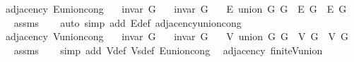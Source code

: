 \begin{isabellebody}
\isamarkupfalse%
\ {\isacharparenleft}{\kern0pt}\ adjacency{\isacharparenright}{\kern0pt}\ E{\isacharunderscore}{\kern0pt}union{\isacharunderscore}{\kern0pt}cong{\isacharcolon}{\kern0pt}\isanewline
\ \ \ {\isachardoublequoteopen}invar\ G{}{\isachardoublequoteclose}\isanewline
\ \ \ {\isachardoublequoteopen}invar\ G{}{\isachardoublequoteclose}\isanewline
\ \ \ {\isachardoublequoteopen}E\ {\isacharparenleft}{\kern0pt}union\ G{}\ G{}{\isacharparenright}{\kern0pt}\ {\isacharequal}{\kern0pt}\ E\ G{}\ {\isasymunion}\ E\ G{}{\isachardoublequoteclose}\isanewline
%
\isadelimproof
\ \ %
\endisadelimproof
%
\isatagproof
{}\isamarkupfalse%
\ assms\isanewline
\ \ \isamarkupfalse%
\ {\isacharparenleft}{\kern0pt}auto\ simp\ add{\isacharcolon}{\kern0pt}\ E{\isacharunderscore}{\kern0pt}def\ adjacency{\isacharunderscore}{\kern0pt}union{\isacharunderscore}{\kern0pt}cong{\isacharparenright}{\kern0pt}%
\endisatagproof
{\isafoldproof}%
%
\isadelimproof
\isanewline
%
\endisadelimproof
\isanewline
{}\isamarkupfalse%
\ {\isacharparenleft}{\kern0pt}\ adjacency{\isacharparenright}{\kern0pt}\ V{\isacharunderscore}{\kern0pt}union{\isacharunderscore}{\kern0pt}cong{\isacharcolon}{\kern0pt}\isanewline
\ \ \ {\isachardoublequoteopen}invar\ G{}{\isachardoublequoteclose}\isanewline
\ \ \ {\isachardoublequoteopen}invar\ G{}{\isachardoublequoteclose}\isanewline
\ \ \ {\isachardoublequoteopen}V\ {\isacharparenleft}{\kern0pt}union\ G{}\ G{}{\isacharparenright}{\kern0pt}\ {\isacharequal}{\kern0pt}\ V\ G{}\ {\isasymunion}\ V\ G{}{\isachardoublequoteclose}\isanewline
%
\isadelimproof
\ \ %
\endisadelimproof
%
\isatagproof
{}\isamarkupfalse%
\ assms\isanewline
\ \ \isamarkupfalse%
\ {\isacharparenleft}{\kern0pt}simp\ add{\isacharcolon}{\kern0pt}\ V{\isacharunderscore}{\kern0pt}def\ Vs{\isacharunderscore}{\kern0pt}def\ E{\isacharunderscore}{\kern0pt}union{\isacharunderscore}{\kern0pt}cong{\isacharparenright}{\kern0pt}%
\endisatagproof
{\isafoldproof}%
%
\isadelimproof
\isanewline
%
\endisadelimproof
\isanewline
{}\isamarkupfalse%
\ {\isacharparenleft}{\kern0pt}\ adjacency{\isacharparenright}{\kern0pt}\ finite{\isacharunderscore}{\kern0pt}V{\isacharunderscore}{\kern0pt}union{\isacharcolon}{\kern0pt}\isanewline

\end{isabellebody}
